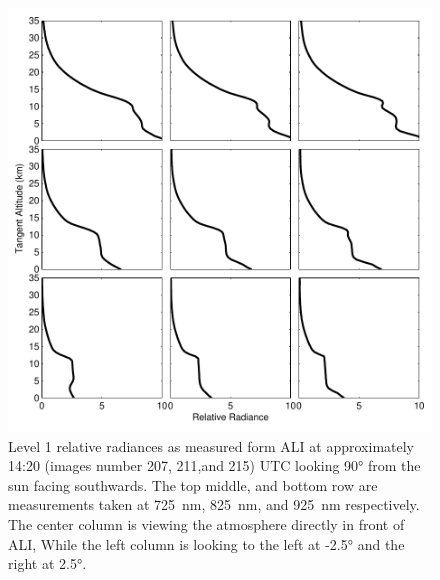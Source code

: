\documentclass[12pt]{article}
\begin{document}
\begin{figure}
\includegraphics[width=1.0\textwidth]{./Images/AliRadiances.pdf}
    \caption{Level 1 relative radiances as measured form ALI at approximately 14:20 (images number 207, 211,and 215) UTC looking 90\si{\degree} from the sun facing southwards. The top middle, and bottom row are measurements taken at 725~nm, 825~nm, and 925~nm respectively. The center column is viewing the atmosphere directly in front of ALI, While the left column is looking to the left at -2.5\si{\degree} and the right at 2.5\si{\degree}. }
    \label{fig:AliRadiances}
\end{figure}
\end{document}

